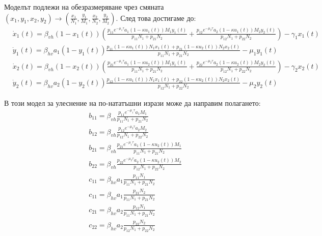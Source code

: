 Моделът подлежи на обезразмеряване чрез смяната $(x_1, y_1, x_2, y_2) \rightarrow (\frac{x_1}{N_1}, \frac{y_1}{M_1}, \frac{x_2}{N_2}, \frac{y_2}{M_2})$. След това достигаме до:
\begin{equation}
  \label{eq:TheDimensionlessProblemFull}
  \begin{split}
    &\dot{x}_1(t) = \beta_{vh} (1-x_1(t)) \left(\frac{p_{11} e^{-\mu_1 \tau} a_1 (1-\kappa u_1(t)) M_1 y_1(t)}{p_{11} N_1 + p_{21} N_2} + \frac{p_{12} e^{-\mu_2 \tau} a_2 (1-\kappa u_1(t)) M_2 y_2(t)}{p_{12} N_1 + p_{22} N_2}\right) - \gamma_1 x_1(t) \\
    &\dot{y}_1(t) = \beta_{hv} a_1 (1-y_1(t)) \frac{p_{11} (1-\kappa u_1(t)) N_1 x_1(t) + p_{21} (1-\kappa u_2(t)) N_2 x_2(t)}{p_{11} N_1 + p_{21} N_2} - \mu_1 y_1(t) \\
    &\dot{x}_2(t) = \beta_{vh} (1-x_2(t)) \left(\frac{p_{21} e^{-\mu_1 \tau} a_1 (1-\kappa u_2(t)) M_1 y_1(t)}{p_{11} N_1 + p_{21} N_2} + \frac{p_{22} e^{-\mu_2 \tau} a_2 (1-\kappa u_2(t)) M_2 y_2(t)}{p_{12} N_1 + p_{22} N_2}\right) - \gamma_2 x_2(t) \\
    &\dot{y}_2(t) = \beta_{hv} a_2 (1-y_2(t)) \frac{p_{12} (1-\kappa u_1(t)) N_1 x_1(t) + p_{22} (1-\kappa u_2(t)) N_2 x_2(t)}{p_{12} N_1 + p_{22} N_2} - \mu_2 y_2(t)
  \end{split}
\end{equation}

В този модел за улеснение на по-нататъшни изрази може да направим полагането:
\begin{equation}
  \begin{split}
    &b_{11} = \beta_{vh} \frac{p_{11} e^{-\mu_1 \tau} a_1 M_1}{p_{11} N_1 + p_{21} N_2} \\
    &b_{12} = \beta_{vh} \frac{p_{12} e^{-\mu_2 \tau} a_2 M_2}{p_{12} N_1 + p_{22} N_2} \\
    &b_{21} = \beta_{vh} \frac{p_{21} e^{-\mu_1 \tau} a_1 (1-\kappa u_2(t)) M_1}{p_{11} N_1 + p_{21} N_2} \\
    &b_{22} = \beta_{vh} \frac{p_{22} e^{-\mu_2 \tau} a_2 (1-\kappa u_2(t)) M_2}{p_{12} N_1 + p_{22} N_2} \\
    &c_{11} = \beta_{hv} a_1 \frac{p_{11} N_1}{p_{11} N_1 + p_{21} N_2} \\
    &c_{11} = \beta_{hv} a_1 \frac{p_{21} N_2}{p_{11} N_1 + p_{21} N_2} \\
    &c_{21} = \beta_{hv} a_2 \frac{p_{12} N_1}{p_{11} N_1 + p_{21} N_2} \\
    &c_{22} = \beta_{hv} a_2 \frac{p_{22} N_2}{p_{12} N_1 + p_{22} N_2} \\
  \end{split}
\end{equation}

